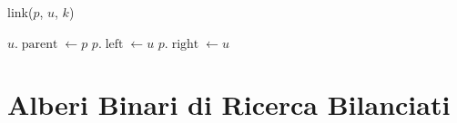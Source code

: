             \begin{algorithm}[H]
                \caption{link(\Tree $ p $, \Tree $ u $, \Item $ k $)}
                \begin{algorithmic}
                        \State $ u.\operatorname{parent} \gets p $
                    \EndIf
                            \State $ p.\operatorname{left} \gets u $
                        \Else
                            \State $ p.\operatorname{right} \gets u $
                        \EndIf
                    \EndIf
                \end{algorithmic}
            \end{algorithm}
\section{Alberi Binari di Ricerca Bilanciati}